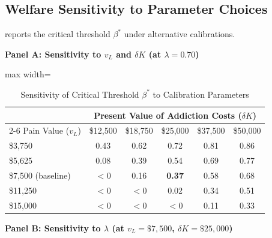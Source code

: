 \documentclass[12pt]{article}
\begin{document}
\subsection{Welfare Sensitivity to Parameter Choices}

 reports the critical threshold $\beta^*$ under alternative calibrations.

\textbf{Panel A: Sensitivity to $v_L$ and $\delta K$ (at $\lambda = 0.70$)}

\begin{table}[htbp]
\centering
\caption{Sensitivity of Critical Threshold $\beta^*$ to Calibration Parameters}
\label{tab:welfare_sensitivity}
\begin{adjustbox}{max width=\textwidth}
\begin{threeparttable}
\begin{tabular}{lccccc}
\toprule
& \multicolumn{5}{c}{Present Value of Addiction Costs ($\delta K$)} \\
\cmidrule(lr){2-6}
Pain Value ($v_L$) & \$12,500 & \$18,750 & \$25,000 & \$37,500 & \$50,000 \\
\midrule
\$3,750 & 0.43 & 0.62 & 0.72 & 0.81 & 0.86 \\
\$5,625 & 0.08 & 0.39 & 0.54 & 0.69 & 0.77 \\
\$7,500 (baseline) & $<0$ & 0.16 & \textbf{0.37} & 0.58 & 0.68 \\
\$11,250 & $<0$ & $<0$ & 0.02 & 0.34 & 0.51 \\
\$15,000 & $<0$ & $<0$ & $<0$ & 0.11 & 0.33 \\
\bottomrule
\end{tabular}
\end{threeparttable}
\end{adjustbox}
\end{table}

\textbf{Panel B: Sensitivity to $\lambda$ (at $v_L = \$7{,}500$, $\delta K = \$25{,}000$)}
\end{document}
